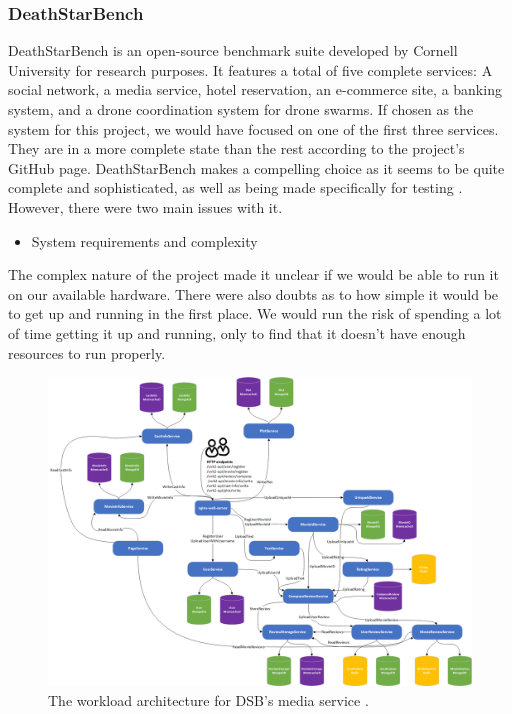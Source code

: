 \subsubsection{DeathStarBench}
DeathStarBench is an open-source benchmark suite developed by Cornell University for research purposes.
It features a total of five complete services: A social network, a media service, hotel reservation, an e-commerce site, a banking system, and a drone coordination system for drone swarms. If chosen as the system for this project, we would have focused on one of the first three services. They are in a more complete state than the rest according to the project's GitHub page.
DeathStarBench makes a compelling choice as it seems to be quite complete and sophisticated, as well as being made specifically for testing \cite*{Gan2019}. \\
However, there were two main issues with it.
\begin{itemize}
    \item System requirements and complexity
\end{itemize}
The complex nature of the project made it unclear if we would be able to run it on our available hardware. There were also doubts as to how simple it would be to get up and running in the first place. We would run the risk of spending a lot of time getting it up and running, only to find that it doesn't have enough resources to run properly.
\begin{figure}[ht]
    \centering
    \includegraphics[width=\columnwidth]{Figures/Charts/media_microservices_architecture.png}
    \caption{The workload architecture for DSB's media service \cite*{Gan2019}.}
    \label{DSB-media}
\end{figure}
